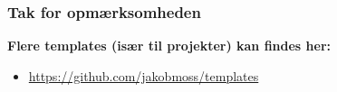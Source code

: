 \documentclass[handout]{beamer}
\newcommand\mygithub{\url{https://github.com/jakobmoss/templates}}
\begin{document}
\begin{frame}
  \frametitle{Tak for opmærksomheden}

  \textbf{Flere templates (især til projekter) kan findes her:}
  \begin{itemize}
  \item \mygithub{}
  \end{itemize}

\end{frame}





\end{document}
